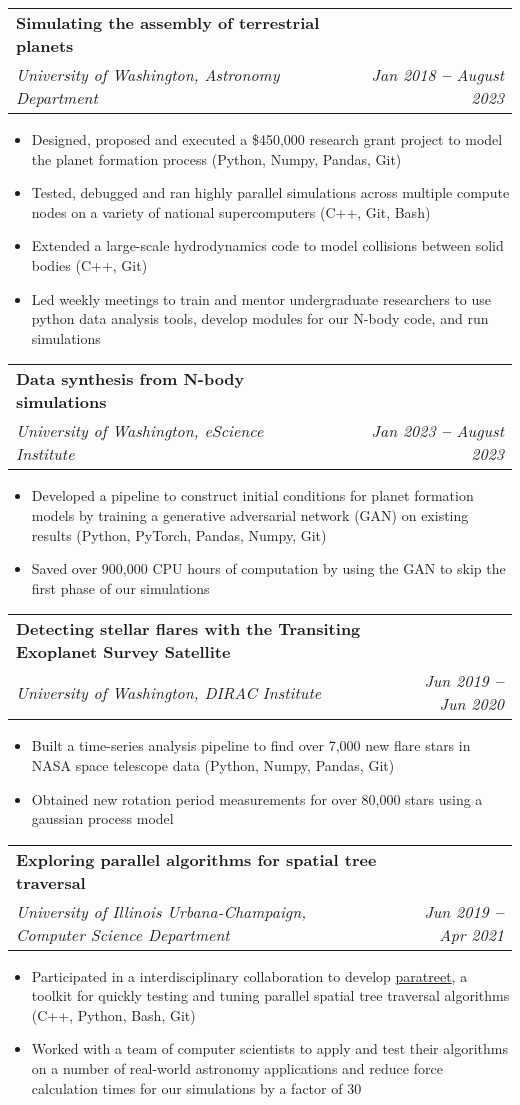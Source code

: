 \documentclass[letterpaper,11pt]{article}
\makeatletter
\newcommand{\resumeItem}[1]{
  \item\small{
    {#1 \vspace{-2pt}}
  }
}
\newcommand{\resumeSubheading}[4]{
  \vspace{-2pt}\item
    \begin{tabular*}{0.97\textwidth}[t]{l@{\extracolsep{\fill}}r}
      \textbf{#1} & #2 \\
      \textit{\small#3} & \textit{\small #4} \\
    \end{tabular*}\vspace{-7pt}
}
\newcommand{\resumeItemListStart}{\begin{itemize}}
\newcommand{\resumeItemListEnd}{\end{itemize}\vspace{-5pt}}
\makeatother
\begin{document}
    \resumeSubheading
      {Simulating the assembly of terrestrial planets}{}
      {University of Washington, Astronomy Department}{Jan 2018 \textbf{--} August 2023}
        \resumeItemListStart
        	    \resumeItem{Designed, proposed and executed a \$450,000 research grant project to model the planet formation process (Python, Numpy, Pandas, Git)}
            \resumeItem{Tested, debugged and ran highly parallel simulations across multiple compute nodes on a variety of national supercomputers (C++, Git, Bash)}
            \resumeItem{Extended a large-scale hydrodynamics code to model collisions between solid bodies (C++, Git)}
            \resumeItem{Led weekly meetings to train and mentor undergraduate researchers to use python data analysis tools, develop modules for our N-body code, and run simulations}
        \resumeItemListEnd
        
          \resumeSubheading
      {Data synthesis from N-body simulations}{}
      {University of Washington, eScience Institute}{Jan 2023 \textbf{--} August 2023}
        \resumeItemListStart
        	   \resumeItem{Developed a pipeline to construct initial conditions for planet formation models by training a generative adversarial network (GAN) on existing results (Python, PyTorch, Pandas, Numpy, Git)}
            \resumeItem{Saved over 900,000 CPU hours of computation by using the GAN to skip the first phase of our simulations}
        \resumeItemListEnd
    
    \resumeSubheading
      {Detecting stellar flares with the Transiting Exoplanet Survey Satellite}{}
      {University of Washington, DIRAC Institute}{Jun 2019 \textbf{--} Jun 2020}
        \resumeItemListStart
        	    \resumeItem{Built a time-series analysis pipeline to find over 7,000 new flare stars in NASA space telescope data (Python, Numpy, Pandas, Git)}
	    \resumeItem{Obtained new rotation period measurements for over 80,000 stars using a gaussian process model}
        \resumeItemListEnd
        
        \resumeSubheading
      {Exploring parallel algorithms for spatial tree traversal}{}
      {University of Illinois Urbana-Champaign, Computer Science Department}{Jun 2019 \textbf{--} Apr 2021}
        \resumeItemListStart
            \resumeItem{Participated in a interdisciplinary collaboration to develop {\sc \href{https://paratreet.github.io/}{paratreet}}, a toolkit for quickly testing and tuning parallel spatial tree traversal algorithms (C++, Python, Bash, Git)}
            \resumeItem{Worked with a team of computer scientists to apply and test their algorithms on a number of real-world astronomy applications and reduce force calculation times for our simulations by a factor of 30}
        \resumeItemListEnd
    
\end{document}
